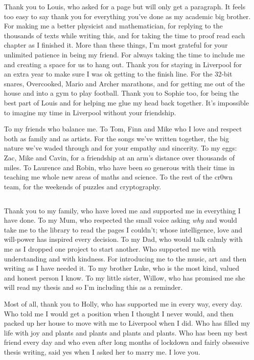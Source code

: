 Thank you to Louis, who asked for a page but will only get a paragraph. It feels too easy to say thank you for everything you've done as my academic big brother. For making me a better physicist and mathematician, for replying to the thousands of texts while writing this, and for taking the time to proof read each chapter as I finished it. More than these things, I'm most grateful for your unlimited patience in being my friend. For always taking the time to include me and creating a space for us to hang out. Thank you for staying in Liverpool for an extra year to make sure I was ok getting to the finish line. For the 32-bit snares, Overcooked, Mario and Archer marathons, and for getting me out of the house and into a gym to play football. Thank you to Sophie too, for being the best part of Louis and for helping me glue my head back together. It's impossible to imagine my time in Liverpool without your friendship. 

To my friends who balance me. To Tom, Finn and Mike who I love and respect both as family and as artists. For the songs we've written together, the big nature we've waded through and for your empathy and sincerity. To my eggs: Zac, Mike and Cavin, for a friendship at an arm's distance over thousands of miles. To Laurence and Robin, who have been so generous with their time in teaching me whole new areas of maths and science. To the rest of the cr0wn team, for the weekends of puzzles and cryptography. ${\color{white} \mathtt{union\{black\_holes\_and\_supergravity\}}}$

Thank you to my family, who have loved me and supported me in everything I have done. To my Mum, who respected the small voice asking \emph{why} and would take me to the library to read the pages I couldn't; whose intelligence, love and will-power has inspired every decision. To my Dad, who would talk calmly with me as I dropped one project to start another. Who supported me with understanding and with kindness. For introducing me to the music, art and then writing as I have needed it. To my brother Luke, who is the most kind, valued and honest person I know. To my little sister, Willow, who has promised me she will read my thesis and so I'm including this as a reminder.  

Most of all, thank you to Holly, who has supported me in every way, every day. Who told me I would get a position when I thought I never would, and then packed up her house to move with me to Liverpool when I did. Who has filled my life with joy and plants and plants and plants and plants. Who has been my best friend every day and who even after long months of lockdown and fairly obsessive thesis writing, said yes when I asked her to marry me. I love you.